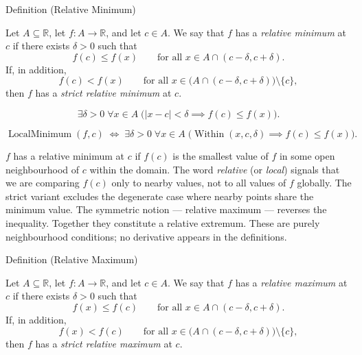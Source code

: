 
\begin{definitionbox}{Definition (Relative Minimum)}
\begin{definition}
\label{def:relative-minimum}
Let $A \subseteq \mathbb{R}$, let $f : A \to \mathbb{R}$, and let $c \in A$. We say that $f$ has a \emph{relative minimum} at $c$ if there exists $\delta > 0$ such that
\[
f(c) \leq f(x) \qquad \text{for all } x \in A \cap (c-\delta,c+\delta).
\]
If, in addition,
\[
f(c) < f(x) \qquad \text{for all } x \in \bigl(A \cap (c-\delta,c+\delta)\bigr)\setminus\{c\},
\]
then $f$ has a \emph{strict relative minimum} at $c$.
\end{definition}
\end{definitionbox}

\begin{remark*}
\[
\exists \delta > 0\;\forall x \in A\;
\bigl(|x - c| < \delta \implies f(c) \leq f(x)\bigr).
\]
\end{remark*}

\begin{remark*}
\[
\operatorname{LocalMinimum}(f, c)
\;\Longleftrightarrow\;
\exists \delta > 0\;\forall x \in A\;
\bigl(\operatorname{Within}(x, c, \delta) \implies f(c) \leq f(x)\bigr).
\]
\end{remark*}

\begin{remark*}[Interpretation]
$f$ has a relative minimum at $c$ if $f(c)$ is the smallest value of $f$ in some open neighbourhood of $c$ within the domain. The word \emph{relative} (or \emph{local}) signals that we are comparing $f(c)$ only to nearby values, not to all values of $f$ globally. The strict variant excludes the degenerate case where nearby points share the minimum value. The symmetric notion --- relative maximum --- reverses the inequality. Together they constitute a relative extremum. These are purely neighbourhood conditions; no derivative appears in the definitions.
\end{remark*}

\NoLocalDependencies

\begin{definitionbox}{Definition (Relative Maximum)}
\begin{definition}
\label{def:relative-maximum}
Let $A \subseteq \mathbb{R}$, let $f : A \to \mathbb{R}$, and let $c \in A$. We say that $f$ has a \emph{relative maximum} at $c$ if there exists $\delta > 0$ such that
\[
f(x) \leq f(c) \qquad \text{for all } x \in A \cap (c-\delta,c+\delta).
\]
If, in addition,
\[
f(x) < f(c) \qquad \text{for all } x \in \bigl(A \cap (c-\delta,c+\delta)\bigr)\setminus\{c\},
\]
then $f$ has a \emph{strict relative maximum} at $c$.
\end{definition}
\end{definitionbox}

